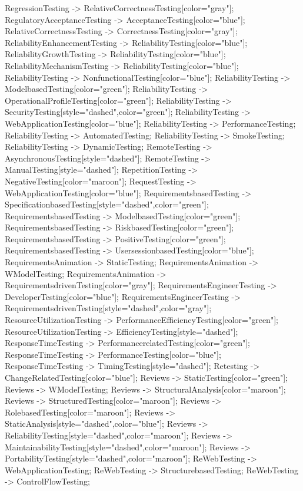 \documentclass{article}
\begin{document}
{RegressionTesting -> RelativeCorrectnessTesting[color="gray"];
RegulatoryAcceptanceTesting -> AcceptanceTesting[color="blue"];
RelativeCorrectnessTesting -> CorrectnessTesting[color="gray"];
ReliabilityEnhancementTesting -> ReliabilityTesting[color="blue"];
ReliabilityGrowthTesting -> ReliabilityTesting[color="blue"];
ReliabilityMechanismTesting -> ReliabilityTesting[color="blue"];
ReliabilityTesting -> NonfunctionalTesting[color="blue"];
ReliabilityTesting -> ModelbasedTesting[color="green"];
ReliabilityTesting -> OperationalProfileTesting[color="green"];
ReliabilityTesting -> SecurityTesting[style="dashed",color="green"];
ReliabilityTesting -> WebApplicationTesting[color="blue"];
ReliabilityTesting -> PerformanceTesting;
ReliabilityTesting -> AutomatedTesting;
ReliabilityTesting -> SmokeTesting;
ReliabilityTesting -> DynamicTesting;
RemoteTesting -> AsynchronousTesting[style="dashed"];
RemoteTesting -> ManualTesting[style="dashed"];
RepetitionTesting -> NegativeTesting[color="maroon"];
RequestTesting -> WebApplicationTesting[color="blue"];
RequirementsbasedTesting -> SpecificationbasedTesting[style="dashed",color="green"];
RequirementsbasedTesting -> ModelbasedTesting[color="green"];
RequirementsbasedTesting -> RiskbasedTesting[color="green"];
RequirementsbasedTesting -> PositiveTesting[color="green"];
RequirementsbasedTesting -> UsersessionbasedTesting[color="blue"];
RequirementsAnimation -> StaticTesting;
RequirementsAnimation -> WModelTesting;
RequirementsAnimation -> RequirementsdrivenTesting[color="gray"];
RequirementsEngineerTesting -> DeveloperTesting[color="blue"];
RequirementsEngineerTesting -> RequirementsdrivenTesting[style="dashed",color="gray"];
ResourceUtilizationTesting -> PerformanceEfficiencyTesting[color="green"];
ResourceUtilizationTesting -> EfficiencyTesting[style="dashed"];
ResponseTimeTesting -> PerformancerelatedTesting[color="green"];
ResponseTimeTesting -> PerformanceTesting[color="blue"];
ResponseTimeTesting -> TimingTesting[style="dashed"];
Retesting -> ChangeRelatedTesting[color="blue"];
Reviews -> StaticTesting[color="green"];
Reviews -> WModelTesting;
Reviews -> StructuralAnalysis[color="maroon"];
Reviews -> StructuredTesting[color="maroon"];
Reviews -> RolebasedTesting[color="maroon"];
Reviews -> StaticAnalysis[style="dashed",color="blue"];
Reviews -> ReliabilityTesting[style="dashed",color="maroon"];
Reviews -> MaintainabilityTesting[style="dashed",color="maroon"];
Reviews -> PortabilityTesting[style="dashed",color="maroon"];
ReWebTesting -> WebApplicationTesting;
ReWebTesting -> StructurebasedTesting;
ReWebTesting -> ControlFlowTesting;
}
\end{document}
